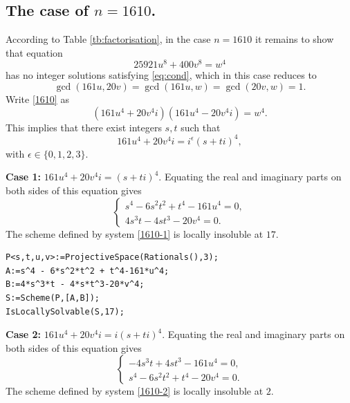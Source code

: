 \documentclass[a4paper,12pt,english,reqno]{amsart}
\begin{document}
\subsection{The case of $n=1610$.}%
According to Table \ref{tb:factorisation}, in the case $n=1610$ it remains to
show that equation
\begin{equation}\label{1610}
25921 u^8 + 400 v^8= w^4
\end{equation}
has no integer solutions satisfying \eqref{eq:cond}, which in this case reduces to \[\gcd(161u,20v)=\gcd(161u,w)=\gcd(20v,w)=1.\] Write \eqref{1610} as
\begin{equation} (161 u^4+20v^4i)(161 u^4-20v^4i)=w^4.
\end{equation}
This implies that there exist integers $s,t$ such that 
\[161 u^4+20v^4i=i^{\epsilon}(s+ti)^4,\]
with $\epsilon \in \{0,1,2,3\}$.


{\bf Case 1:} $161 u^4+20v^4i=(s+ti)^4$. Equating the real and imaginary parts on both sides of this equation gives
\begin{equation}\label{1610-1}
\begin{cases}
s^4 - 6s^2t^2 + t^4-161u^4=0,\\
4s^3t - 4st^3-20v^4=0.
\end{cases}
\end{equation}
The scheme defined by system \eqref{1610-1} is locally insoluble at $17$.

\begin{lstlisting}
P<s,t,u,v>:=ProjectiveSpace(Rationals(),3);
A:=s^4 - 6*s^2*t^2 + t^4-161*u^4;
B:=4*s^3*t - 4*s*t^3-20*v^4;
S:=Scheme(P,[A,B]);
IsLocallySolvable(S,17);
\end{lstlisting}

{\bf Case 2:} $161 u^4+20v^4i=i(s+ti)^4$. Equating the real and imaginary parts on both sides of this equation gives
\begin{equation}\label{1610-2}
\begin{cases}
- 4s^3t + 4st^3-161u^4=0,\\
s^4 - 6s^2t^2 + t^4-20v^4=0.
\end{cases}
\end{equation}
The scheme defined by system \eqref{1610-2} is locally insoluble at $2$.
\end{document}
